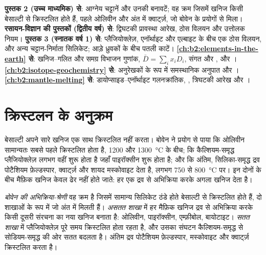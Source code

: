\begin{recall}
\textbf{पुस्तक 2 (उच्च माध्यमिक) से}: आग्नेय चट्टानें और उनकी बनावटें; वह क्रम
जिसमें खनिज किसी बेसाल्टी  से क्रिस्टलित होते हैं, पहले ओलिवीन और अंत में क्वार्ट्ज़,
जो बोवेन के प्रयोगों से मिला। \textbf{रसायन-विज्ञान की पुस्तकों (द्वितीय वर्ष) से}:
द्विघटकी प्रावस्था आरेख, ठोस विलयन और उत्तोलक नियम।
\textbf{पुस्तक 3 (स्नातक वर्ष 1) से}: प्लैजियोक्लेज़, एनॉर्थाइट  और
एल्बाइट  के बीच एक ठोस विलयन, और अन्य चट्टान-निर्माता सिलिकेट; आड़े
ध्रुवकों के बीच पतली काटें। \textbf{\cref{ch:b2:elements-in-the-earth} से}: खनिज--गलित और समग्र
विभाजन गुणांक, $\bar D = \sum_i x_i D_i$, संगत और ,  और । \textbf{\cref{ch:b2:isotope-geochemistry} से}:
अनुरेखकों के रूप में समस्थानिक अनुपात और । \textbf{\cref{ch:b2:mantle-melting} से}: डायोप्साइड--एनॉर्थाइट
गलनक्रांतिक, , त्रिघटकी आरेख और ।
\end{recall}

\section{क्रिस्टलन के अनुक्रम}\label{sec:b2:magmatic-differentiation:sequences}

बेसाल्टी  अपने सारे खनिज एक साथ क्रिस्टलित नहीं करता। बोवेन ने
प्रयोग से पाया कि ओलिवीन सामान्यतः सबसे पहले क्रिस्टलित होता है, 1200 और
\qty{1300}{\celsius} के बीच; कि कैल्शियम-समृद्ध प्लैजियोक्लेज़ लगभग वहीं शुरू होता है जहाँ पाइरॉक्सीन
शुरू होता है; और कि अंतिम, सिलिका-समृद्ध द्रव पोटैशियम फ़ेल्डस्पार, क्वार्ट्ज़ और
शायद मस्कोवाइट देता है, लगभग 750 से \qty{800}{\celsius} पर। इन दोनों के बीच मैफ़िक
खनिज केवल ढेर नहीं होते जाते: हर एक द्रव से अभिक्रिया करके अगला खनिज देता है।

\begin{definition}[बोवेन की अभिक्रिया-श्रेणी]\label{def:b2:magmatic-differentiation:bowen}
\emph{बोवेन की अभिक्रिया-श्रेणी} वह क्रम है जिसमें
सामान्य सिलिकेट ठंडे होते बेसाल्टी  से क्रिस्टलित होते हैं, दो शाखाओं के रूप में
जो अंत में मिलती हैं। \emph{असतत शाखा} में हर मैफ़िक खनिज
द्रव से अभिक्रिया करके किसी दूसरी संरचना का नया खनिज बनाता है: ओलिवीन,
पाइरॉक्सीन, एम्फ़ीबोल, बायोटाइट। \emph{सतत शाखा} में प्लैजियोक्लेज़
पूरे समय क्रिस्टलित होता रहता है, और उसका संघटन कैल्शियम-समृद्ध से सोडियम-समृद्ध
की ओर सतत बदलता है। अंतिम द्रव पोटैशियम फ़ेल्डस्पार, मस्कोवाइट और
क्वार्ट्ज़ क्रिस्टलित करता है।
\end{definition}

